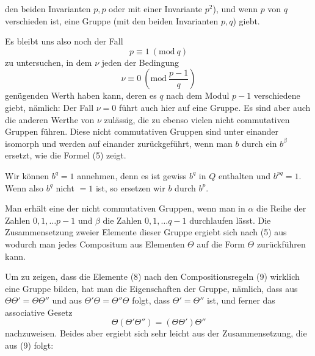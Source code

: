 den beiden Invarianten $p, p$ oder mit einer Invariante $p^2$), und
wenn $p$ von $q$ verschieden ist, eine Gruppe (mit den beiden Invarianten
 $p, q$) giebt.

Es bleibt uns also noch der Fall
\[
p \equiv 1\ (\mathrm{mod}\ q)
\]
zu untersuchen, in dem $\nu$ jeden der Bedingung
\[
\nu \equiv 0\ \left(\mathrm{mod}\ \frac{p-1}{q}\right)
\]
genügenden Werth haben kann, deren es $q$ nach dem Modul
$p - 1$ verschiedene giebt, nämlich:
Der Fall $\nu = 0$ führt auch hier auf eine  Gruppe.
Es sind aber auch die anderen Werthe von $\nu$ zulässig, die zu
ebenso vielen nicht commutativen Gruppen führen. Diese nicht
commutativen Gruppen sind unter einander isomorph und werden
auf einander zurückgeführt, wenn man $b$ durch ein $b^\beta$ ersetzt,
wie die Formel (5) zeigt.

Wir können $b^q = 1$ annehmen, denn es ist gewiss $b^q$ in $Q$
enthalten und $b^{pq} = 1$. Wenn also $b^q$ nicht $= 1$ ist, so ersetzen
wir $b$ durch $b^p$.

Man erhält eine der nicht commutativen Gruppen, wenn
man in
$\alpha$ die Reihe der Zahlen $0, 1, \dots p - 1$ und $\beta$ die Zahlen
$0, 1, \dots q - 1$ durchlaufen lässt. Die Zusammensetzung zweier
Elemente dieser Gruppe ergiebt sich nach (5) aus
wodurch man jedes Compositum aus Elementen $\Theta$ auf die Form
$\Theta$ zurückführen kann.

Um zu zeigen, dass die Elemente (8) nach den Compositionsregeln
 (9) wirklich eine Gruppe bilden, hat man die Eigenschaften
der Gruppe, nämlich, dass aus $\Theta\Theta' = \Theta\Theta''$ und aus $\Theta'\Theta = \Theta''\Theta$
folgt, dass $\Theta' = \Theta''$ ist, und ferner das associative Gesetz
\[
\Theta(\Theta'\Theta'') = (\Theta\Theta')\Theta''
\]
nachzuweisen. Beides aber ergiebt sich sehr leicht aus der Zusammensetzung,
die aus (9) folgt:
